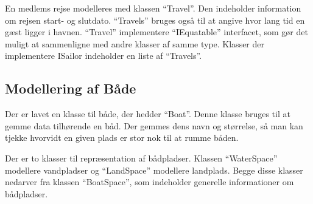 En medlems rejse modelleres med klassen \enquote{Travel}. Den indeholder information om rejsen start- og slutdato. \enquote{Travels} bruges også til at angive hvor lang tid en gæst ligger i havnen. \enquote{Travel} implementere \enquote{IEquatable} interfacet, som gør det muligt at sammenligne med andre klasser af samme type. Klasser der implementere ISailor indeholder en liste af \enquote{Travels}.

\subsection{Modellering af Både}
\label{sub:bade}

Der er lavet en klasse til både, der hedder \enquote{Boat}. Denne klasse bruges til at gemme data tilhørende en båd. Der gemmes dens navn og størrelse, så man kan tjekke hvorvidt en given plads er stor nok til at rumme båden.

Der er to klasser til repræsentation af bådpladser. Klassen \enquote{WaterSpace} modellere vandpladser og \enquote{LandSpace} modellere landplads. Begge disse klasser nedarver fra klassen \enquote{BoatSpace}, som indeholder generelle informationer om bådpladser.

